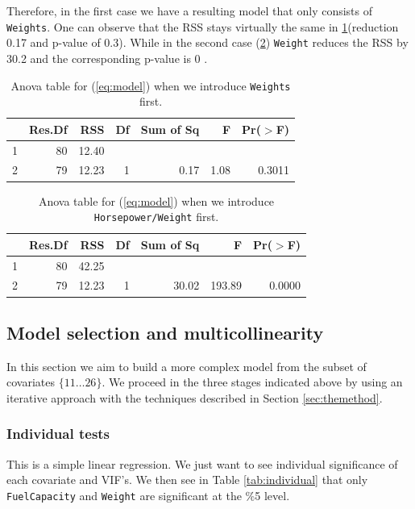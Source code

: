 \documentclass[12pt]{article}
\begin{document}
Therefore, in the first case we have a resulting model that only consists of \texttt{Weights}. One can observe that the RSS stays virtually the same in 
\ref{tab:anovaRSS1}(reduction 0.17 and p-value of 0.3). While in the second case (\ref{tab:anovaRSS2}) \texttt{Weight} reduces the RSS by 30.2 and the corresponding p-value is 0 .

\begin{table}[h]
\centering
\caption{Anova table for (\ref{eq:model}) when we introduce \texttt{Weights} first.}
\label{tab:anovaRSS1}
\begin{tabular}{|lrrrrrr|}
  \hline
 & Res.Df & RSS & Df & Sum of Sq & F & Pr($>$F) \\ 
  \hline
1 & 80 & 12.40 &  &  &  &  \\ 
  2 & 79 & 12.23 & 1 & 0.17 & 1.08 & 0.3011 \\ 
   \hline
\end{tabular}
\end{table}

\begin{table}[h!]
\centering
\caption{Anova table for (\ref{eq:model}) when we introduce \texttt{Horsepower/Weight} first.}
\label{tab:anovaRSS2}
\begin{tabular}{|lrrrrrr|}
  \hline
 & Res.Df & RSS & Df & Sum of Sq & F & Pr($>$F) \\ 
  \hline
1 & 80 & 42.25 &  &  &  &  \\ 
  2 & 79 & 12.23 & 1 & 30.02 & 193.89 & 0.0000 \\ 
   \hline
\end{tabular}
\end{table}

\subsection{Model selection and multicollinearity}
In this section we aim to build a more complex model from the subset of covariates $\{11\ldots26\}$.
We proceed in the three stages indicated above by using an iterative approach with the techniques
described in Section \ref{sec:themethod}.

\subsubsection{Individual tests}
This is a simple linear regression. We just want to see individual significance of each covariate and
VIF's. We then see in Table \ref{tab:individual} that only \texttt{FuelCapacity} and \texttt{Weight} are significant at the \%5 level.
\end{document}
